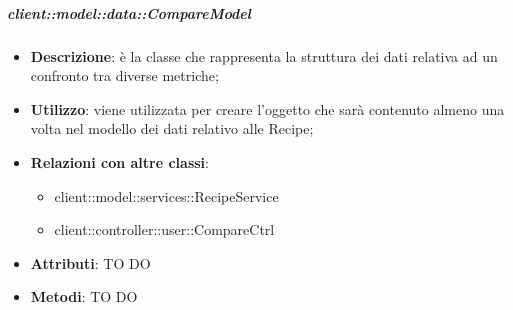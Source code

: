 		\subparagraph{client::model::data::CompareModel} %
		\label{subp:client_model_data_comparemodel}
			\begin{itemize}
				\item \textbf{Descrizione}: è la classe che rappresenta la struttura dei dati relativa ad un confronto tra diverse metriche;
				\item \textbf{Utilizzo}: viene utilizzata per creare l'oggetto che sarà contenuto almeno una volta nel modello dei dati relativo alle Recipe;
				\item \textbf{Relazioni con altre classi}:
					\begin{itemize}
						\item client::model::services::RecipeService
						\item client::controller::user::CompareCtrl
					\end{itemize}
				\item \textbf{Attributi}: TO DO
				\item \textbf{Metodi}: TO DO
			\end{itemize}


